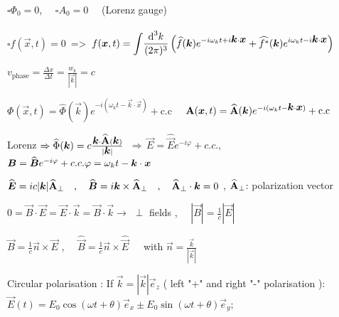 $\square \Phi_0 = 0$, $\quad \square A_0 = 0 \quad$ (Lorenz gauge)
\\
\\
$\square f(\vec{x},t) = 0 \, $ => $\, f(\vec{x},t) = \displaystyle{\int} \frac{\ud ^3k}{(2\pi)^3} \left(\widehat{f}(\vec{k})e^{-i\omega_kt + i\vec{k}\cdot\vec{x}} + \widehat{f^*}(\vec{k})e^{i\omega_k t - i \vec{k}\cdot\vec{x}} \right)$
\\
\begin{squishlist}
\item $v_{\text{phase}} = \frac{\Delta x}{\Delta t} = \frac{w_k}{|\vec{k}|} = c$

\item $\Phi(\vec{x},t) = \widehat{\Phi}(\vec{k}) e^{-i(\omega_k t- \vec{k}\cdot\vec{x})} + \text{c.c}$ $ \quad \vec{\rm{A}}(\vec{x},t) = \widehat{\vec{\rm{A}}}(\vec{k}) e^{-i(\omega_k t-\vec{k}\cdot\vec{x})} + \text{c.c}$ 

\item Lorenz $ \Rightarrow \widehat{\Phi}(\vec{k}) = c\frac{\vec{k}\cdot\widehat{\vec{\rm{A}}}(\vec{k})}{|\vec{k}|} \,$ $\Rightarrow \, \vec{E} = \widehat{\vec{E}} e^{-i\varphi}+c.c., $ $\vec{B} = \widehat{\vec{B}} e^{-i\varphi}+c.c.\newline \varphi = \omega_k t - \vec{k}\cdot\vec{x}$

\item $\widehat{\vec{E}} = i c |\vec{k}| \widehat{\vec{\rm{A}}}_{\perp} \quad, \quad \widehat{\vec{B}} = i \vec{k} \times \widehat{\vec{\rm{A}}}_{\perp} \quad, \quad \widehat{\vec{\rm{A}}}_{\perp} \cdot \vec{k}=0$ , $\widehat{\vec{\rm{A}}}_{\perp}$: polarization vector

\item $0 = \vec{B}\cdot\vec{E} = \vec{E}\cdot\vec{k} = \vec{B}\cdot\vec{k} \rightarrow$ $\perp$ fields , $\quad |\vec{B}| = \frac{1}{c}|\vec{E}|$

\item $\vec{B} = \frac{1}{c} \vec{n} \times \vec{E} $ , $\quad \widehat{\vec{B}} = \frac{1}{c} \vec{n} \times \widehat{\vec{E}} \, \quad $ with $\vec{n} = \frac{\vec{k}}{|\vec{k}|} $

\item Circular polarisation : If $\vec{k} = |\vec{k}|\vec{e}_z$ ( left "+" and right "-" polarisation 
):\\
$\vec{E}(t) = E_0 \cos(\omega t + \theta)\vec{e}_x \pm E_0 \sin(\omega t + \theta)\vec{e}_y$;
\end{squishlist}


